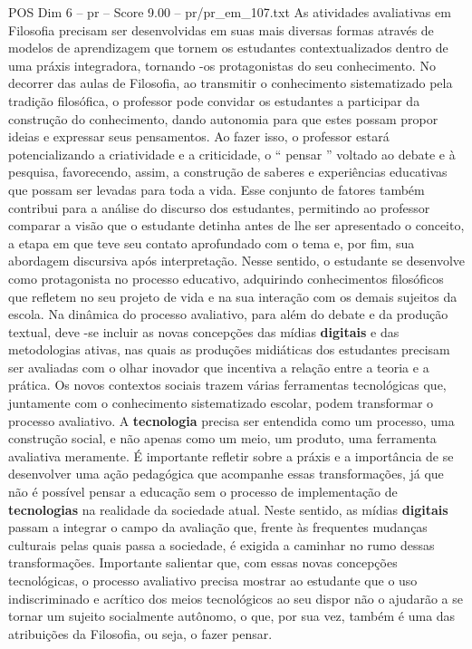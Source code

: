 \begin{textsample}{POS Dim 6 – pr – Score 9.00 – pr/pr\_em\_107.txt}
As atividades avaliativas em Filosofia precisam ser desenvolvidas em suas mais diversas formas através de modelos de aprendizagem que tornem os estudantes contextualizados dentro de uma práxis integradora, tornando -os protagonistas do seu conhecimento.
No decorrer das aulas de Filosofia, ao transmitir o conhecimento sistematizado pela tradição filosófica, o professor pode convidar os estudantes a participar da construção do conhecimento, dando autonomia para que estes possam propor ideias e expressar seus pensamentos.
Ao fazer isso, o professor estará potencializando a criatividade e a criticidade, o “ pensar ” voltado ao debate e à pesquisa, favorecendo, assim, a construção de saberes e experiências educativas que possam ser levadas para toda a vida.
Esse conjunto de fatores também contribui para a análise do discurso dos estudantes, permitindo ao professor comparar a visão que o estudante detinha antes de lhe ser apresentado o conceito, a etapa em que teve seu contato aprofundado com o tema e, por fim, sua abordagem discursiva após interpretação.
Nesse sentido, o estudante se desenvolve como protagonista no processo educativo, adquirindo conhecimentos filosóficos que refletem no seu projeto de vida e na sua interação com os demais sujeitos da escola.
Na dinâmica do processo avaliativo, para além do debate e da produção textual, deve -se incluir as novas concepções das mídias \textbf{digitais} e das metodologias ativas, nas quais as produções midiáticas dos estudantes precisam ser avaliadas com o olhar inovador que incentiva a relação entre a teoria e a prática.
Os novos contextos sociais trazem várias ferramentas tecnológicas que, juntamente com o conhecimento sistematizado escolar, podem transformar o processo avaliativo.
A \textbf{tecnologia} precisa ser entendida como um processo, uma construção social, e não apenas como um meio, um produto, uma ferramenta avaliativa meramente.
É importante refletir sobre a práxis e a importância de se desenvolver uma ação pedagógica que acompanhe essas transformações, já que não é possível pensar a educação sem o processo de implementação de \textbf{tecnologias} na realidade da sociedade atual.
Neste sentido, as mídias \textbf{digitais} passam a integrar o campo da avaliação que, frente às frequentes mudanças culturais pelas quais passa a sociedade, é exigida a caminhar no rumo dessas transformações.
Importante salientar que, com essas novas concepções tecnológicas, o processo avaliativo precisa mostrar ao estudante que o uso indiscriminado e acrítico dos meios tecnológicos ao seu dispor não o ajudarão a se tornar um sujeito socialmente autônomo, o que, por sua vez, também é uma das atribuições da Filosofia, ou seja, o fazer pensar.

\end{textsample}
